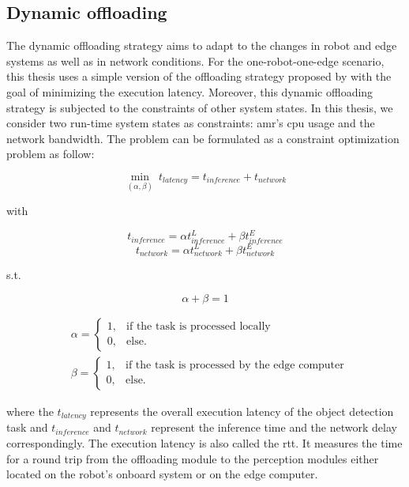 \subsection{Dynamic offloading}

The dynamic offloading strategy aims to adapt to the changes in robot and edge systems as well as in network conditions.  For the one-robot-one-edge scenario, this thesis uses a simple version of the offloading strategy proposed by \citeauthor*{Ning2019} \cite{Ning2019} with the goal of minimizing the execution latency. Moreover, this dynamic offloading strategy is subjected to the constraints of other system states. In this thesis, we consider two run-time system states as constraints: \gls{amr}'s \gls{cpu} usage and the network bandwidth. The problem can be formulated as a constraint optimization problem as follow:

\begin{equation}
    \min_{(\alpha, \beta)} \: t_{latency} = t_{inference} + t_{network}
\end{equation}

with

\begin{equation*}
    t_{inference} = \alpha t_{inference}^{L} + \beta t_{inference}^{E}
\end{equation*}
\begin{equation*}
    t_{network} = \alpha t_{network}^{L} + \beta t_{network}^{E}
\end{equation*}

s.t.

\begin{equation*}
    \alpha + \beta = 1
\end{equation*}

\begin{align*}
    & \alpha = \begin{cases}
        1, & \text{if the task is processed locally} \\
        0, & \text{else.}
    \end{cases} \\
    & \beta = \begin{cases}
        1, & \text{if the task is processed by the edge computer} \\
        0, & \text{else.}
    \end{cases}
\end{align*}

where the $t_{latency}$ represents the overall execution latency of the object detection task and $t_{inference}$ and $t_{network}$ represent the inference time and the network delay correspondingly. The execution latency is also called the \acrlong{rtt}. It measures the time for a round trip from the offloading module to the perception modules either located on the robot's onboard system or on the edge computer. 

